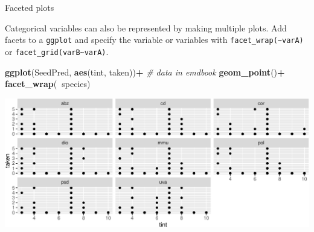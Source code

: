 \documentclass[
  ignorenonframetext,
]{beamer}
\newenvironment{Shaded}{\begin{snugshade}}{\end{snugshade}}
\newcommand{\CommentTok}[1]{\textcolor[rgb]{0.56,0.35,0.01}{\textit{#1}}}
\newcommand{\KeywordTok}[1]{\textcolor[rgb]{0.13,0.29,0.53}{\textbf{#1}}}
\newcommand{\NormalTok}[1]{#1}
\newcommand{\OperatorTok}[1]{\textcolor[rgb]{0.81,0.36,0.00}{\textbf{#1}}}
\newcommand{\StringTok}[1]{\textcolor[rgb]{0.31,0.60,0.02}{#1}}
\begin{document}
\begin{frame}[fragile]{Faceted plots}
\protect\hypertarget{faceted-plots}{}

Categorical variables can also be represented by making multiple plots.
Add facets to a \texttt{ggplot} and specify the variable or variables
with \texttt{facet\_wrap(\textasciitilde{}varA)} or
\texttt{facet\_grid(varB\textasciitilde{}varA)}.

\scriptsize

\begin{Shaded}
\begin{Highlighting}[]
\KeywordTok{ggplot}\NormalTok{(SeedPred, }\KeywordTok{aes}\NormalTok{(tint, taken))}\OperatorTok{+}\StringTok{ }\CommentTok{# data in emdbook}
\StringTok{  }\KeywordTok{geom_point}\NormalTok{()}\OperatorTok{+}
\StringTok{  }\KeywordTok{facet_wrap}\NormalTok{(}\OperatorTok{~}\NormalTok{species)}
\end{Highlighting}
\end{Shaded}

\includegraphics{data_viz_files/figure-beamer/unnamed-chunk-8-1.pdf}

\end{frame}
\end{document}
